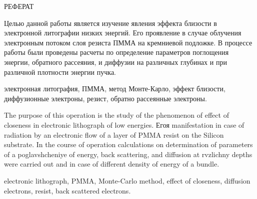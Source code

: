 \begin{center}
РЕФЕРАТ
\end{center}

Целью данной работы является изучение явления эффекта близости в электронной литографии низких энергий.
Его проявление в случае облучения электронным потоком слоя резиста ПММА на кремниевой подложке. В процессе работы были проведены расчеты по определение параметров поглощения энергии, обратного рассеяния, и диффузии на различных глубинах и при различной плотности энергии пучка.
\vspace*{1cm}

\hspace{-1.25cm}электронная литография, ПММА, метод Монте-Карло, эффект близости, диффузионные электроны, резист, обратно рассеянные электроны.
 \vspace*{1cm}

The purpose of this operation is the study of the phenomenon of effect of closeness in electronic lithograph of low energies.
Егоя manifestation in case of radiation by an electronic flow of a layer of PMMA resist on the Silicon substrate. In the course of operation calculations on determination of parameters of a poglavshcheniye of energy, back scattering, and diffusion at rvzlichny depths were carried out and in case of different density of energy of a bundle.
\vspace*{1cm}

\hspace{-1.25cm}electronic lithograph, PMMA, Monte-Carlo method, effect of closeness, diffusion electrons, resist, back scattered electrons.
\pagebreak
